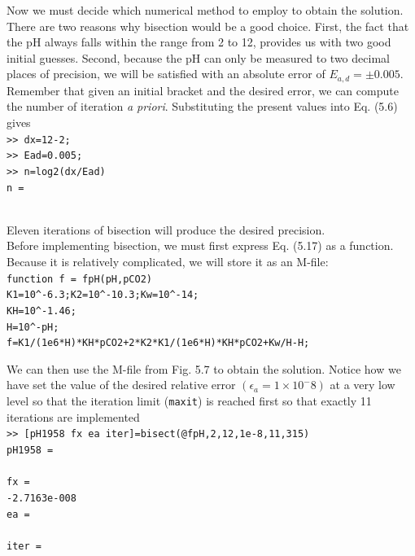 \documentclass[../main.tex]{subfiles}
\begin{document}
Now we must decide which numerical method to employ to obtain the solution. There
are two reasons why bisection would be a good choice. First, the fact that the pH always
falls within the range from 2 to 12, provides us with two good initial guesses. Second, because
the pH can only be measured to two decimal places of precision, we will be satisfied
with an absolute error of $E_{a,d} = \pm0.005$. Remember that given an initial bracket and the
desired error, we can compute the number of iteration \emph{a priori}. Substituting the present values
into Eq. (5.6) gives\\

\texttt{>> dx=12-2;\\
\indent >> Ead=0.005;\\
\indent >> n=log2(dx/Ead)\\
\indent n =\\
\indent{}\\}

\noindent Eleven iterations of bisection will produce the desired precision.\\
Before implementing bisection, we must first express Eq. (5.17) as a function. Because
it is relatively complicated, we will store it as an M-file:\\

\texttt{function f = fpH(pH,pCO2)\\
\indent K1=10\textasciicircum -6.3;K2=10\textasciicircum-10.3;Kw=10\textasciicircum-14;\\
\indent KH=10\textasciicircum-1.46;\\
\indent H=10\textasciicircum-pH;\\
\indent f=K1/(1e6*H)*KH*pCO2+2*K2*K1/(1e6*H)*KH*pCO2+Kw/H-H;\\}

We can then use the M-file from Fig. 5.7 to obtain the solution. Notice how we have
set the value of the desired relative error $(\epsilon_a = 1 \times 10^-8)$ at a very low level so that the iteration
limit (\texttt{maxit}) is reached first so that exactly 11 iterations are implemented\\

\texttt{>> [pH1958 fx ea iter]=bisect(@fpH,2,12,1e-8,11,315)\\
\indent pH1958 =\\
\indent{}\\
\indent fx =\\
\indent\indent -2.7163e-008\\
\indent ea =\\
\indent{}\\
\indent iter =\\
\indent{}\\}
\end{document}
